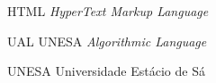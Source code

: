 
\begin{siglas}
  \item[HTML] \textit{HyperText Markup Language}
  \item[UAL] UNESA \textit{Algorithmic Language}
  \item[UNESA] Universidade Estácio de Sá
\end{siglas}
